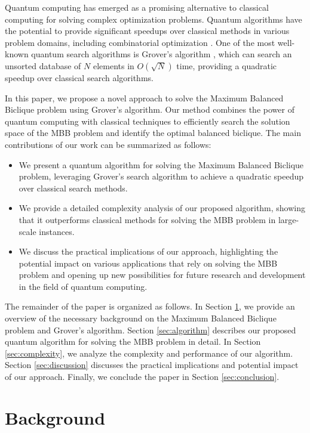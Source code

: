 Quantum computing has emerged as a promising alternative to classical computing for solving complex optimization problems. Quantum algorithms have the potential to provide significant speedups over classical methods in various problem domains, including combinatorial optimization \cite{quantum_review}. One of the most well-known quantum search algorithms is Grover's algorithm \cite{grover}, which can search an unsorted database of $N$ elements in $O(\sqrt{N})$ time, providing a quadratic speedup over classical search algorithms.

In this paper, we propose a novel approach to solve the Maximum Balanced Biclique problem using Grover's algorithm. Our method combines the power of quantum computing with classical techniques to efficiently search the solution space of the MBB problem and identify the optimal balanced biclique. The main contributions of our work can be summarized as follows:

\begin{itemize}
  \item We present a quantum algorithm for solving the Maximum Balanced Biclique problem, leveraging Grover's search algorithm to achieve a quadratic speedup over classical search methods.
  
  \item We provide a detailed complexity analysis of our proposed algorithm, showing that it outperforms classical methods for solving the MBB problem in large-scale instances.
  
  \item We discuss the practical implications of our approach, highlighting the potential impact on various applications that rely on solving the MBB problem and opening up new possibilities for future research and development in the field of quantum computing.
\end{itemize}

The remainder of the paper is organized as follows. In Section \ref{sec:background}, we provide an overview of the necessary background on the Maximum Balanced Biclique problem and Grover's algorithm. Section \ref{sec:algorithm} describes our proposed quantum algorithm for solving the MBB problem in detail. In Section \ref{sec:complexity}, we analyze the complexity and performance of our algorithm. Section \ref{sec:discussion} discusses the practical implications and potential impact of our approach. Finally, we conclude the paper in Section \ref{sec:conclusion}.

\section{Background}
\label{sec:background}

